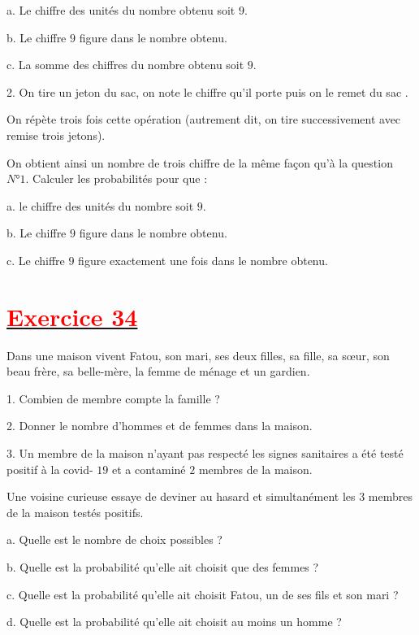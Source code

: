 \documentclass[12pt]{article}
\begin{document}
a. Le chiffre des unités du nombre obtenu soit $9.$

b. Le chiffre $9$ figure dans le nombre obtenu.

c. La somme des chiffres du nombre obtenu soit $9.$

2. On tire un jeton du sac, on note le chiffre qu'il porte puis on le remet du sac . 
	
	On répète trois fois cette opération (autrement dit, on tire successivement avec remise trois jetons).

On obtient ainsi un nombre de trois chiffre de la même façon qu'à la question $N°1.$
Calculer les probabilités pour que :

a. le chiffre des unités du nombre soit $9.$

b. Le chiffre $9$ figure dans le nombre obtenu.

c. Le chiffre $9$ figure exactement une fois dans le nombre obtenu.

\section*{\underline{\textbf{\textcolor{red}{Exercice 34}}}}
Dans une maison vivent Fatou, son mari, ses deux filles, sa fille, sa sœur, son beau frère, sa belle-mère, la femme de ménage et un gardien.

1. Combien de membre compte la famille ?

2. Donner le nombre d'hommes et de femmes dans la maison.

3. Un membre de la maison n'ayant pas respecté les signes sanitaires a été testé positif à la covid- $19$ et a contaminé $2$ membres de la maison. 

Une voisine curieuse essaye de deviner au hasard et simultanément les $3$ membres de la maison testés positifs.

a. Quelle est le nombre de choix possibles ?

b. Quelle est la probabilité qu'elle ait choisit que des femmes ?
	
c. Quelle est la probabilité qu'elle ait choisit Fatou, un de ses fils et son mari ?
	
d. Quelle est la probabilité qu'elle ait choisit au moins un homme ?
\end{document}
